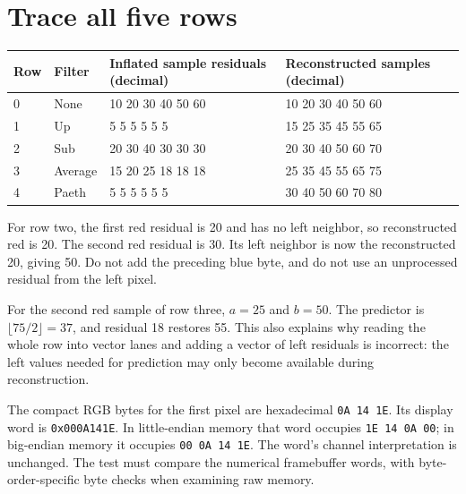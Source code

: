 \section{Trace all five rows}
\begin{longtable}{p{11mm}p{17mm}p{54mm}p{65mm}}
  \toprule Row & Filter  & Inflated sample residuals (decimal) & Reconstructed samples (decimal) \\\midrule
  0            & None    & 10 20 30 40 50 60                   & 10 20 30 40 50 60               \\
  1            & Up      & 5 5 5 5 5 5                         & 15 25 35 45 55 65               \\
  2            & Sub     & 20 30 40 30 30 30                   & 20 30 40 50 60 70               \\
  3            & Average & 15 20 25 18 18 18                   & 25 35 45 55 65 75               \\
  4            & Paeth   & 5 5 5 5 5 5                         & 30 40 50 60 70 80               \\\bottomrule
\end{longtable}
For row two, the first red residual is 20 and has no left neighbor, so reconstructed
red is 20. The second red residual is 30. Its left neighbor is now the reconstructed
20, giving 50. Do not add the preceding blue byte, and do not use an unprocessed
residual from the left pixel.

For the second red sample of row three, $a=25$ and $b=50$. The predictor is
$\lfloor75/2\rfloor=37$, and residual 18 restores 55. This also explains why reading
the whole row into vector lanes and adding a vector of left residuals is incorrect:
the left values needed for prediction may only become available during reconstruction.

The compact RGB bytes for the first pixel are hexadecimal \texttt{0A 14 1E}.
Its display word is \texttt{0x000A141E}. In little-endian memory that word occupies
\texttt{1E 14 0A 00}; in big-endian memory it occupies \texttt{00 0A 14 1E}.
The word's channel interpretation is unchanged. The test must compare the numerical
framebuffer words, with byte-order-specific byte checks when examining raw memory.

